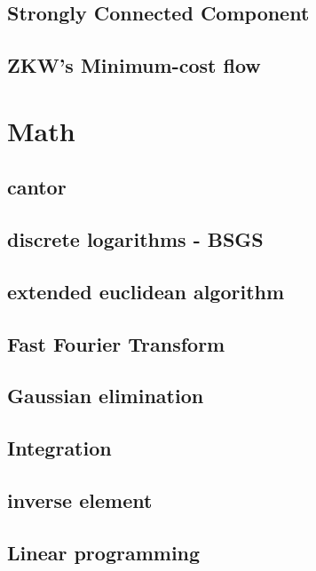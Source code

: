 \documentclass[a4paper,5pt,twocolumn,titlepage]{article}
\begin{document}
\subsection{Strongly Connected Component}

\subsection{ZKW's Minimum-cost flow}


\section{Math}
\subsection{cantor}

\subsection{discrete logarithms - BSGS}

\subsection{extended euclidean algorithm}

\subsection{Fast Fourier Transform}

\subsection{Gaussian elimination}

\subsection{Integration}

\subsection{inverse element}

\subsection{Linear programming}

\end{document}
